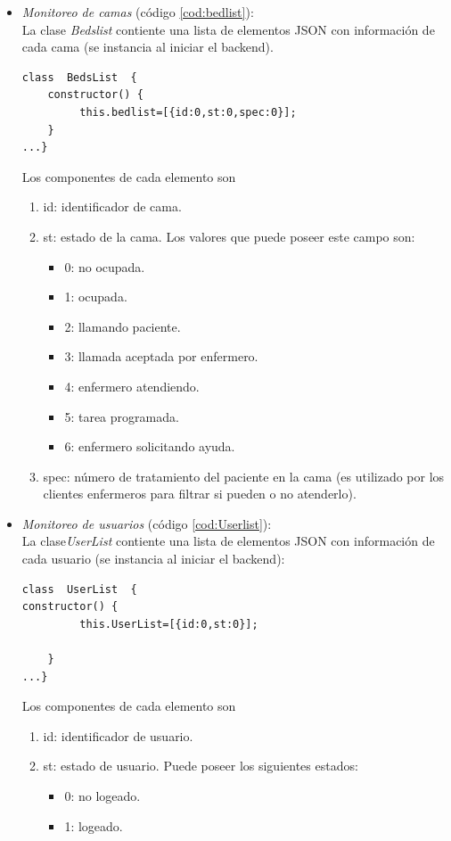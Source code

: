 \begin{itemize}

\item \textit{ Monitoreo de camas} (código \ref{cod:bedlist}):\\
La clase \textit{Bedslist} contiente una lista de elementos JSON con información de cada cama (se instancia al iniciar el backend).

\begin{lstlisting}[label=cod:bedlist,caption=  Clase Bedlist.]
class  BedsList  {    
    constructor() {
         this.bedlist=[{id:0,st:0,spec:0}];                        
    }
...}
\end{lstlisting}

Los componentes de cada elemento son 
\begin{enumerate}
\item id: identificador de cama.
\item st: estado de la cama. Los valores que puede poseer este campo son: 
\begin{itemize}
\item 0: no ocupada.
\item 1: ocupada.
\item 2: llamando paciente.
\item 3: llamada aceptada por enfermero.
\item 4: enfermero atendiendo.
\item 5: tarea programada.
\item 6: enfermero solicitando ayuda.
\end{itemize}
\item spec: número de tratamiento del paciente en la cama (es utilizado por los clientes enfermeros para filtrar si pueden o no atenderlo).
\end{enumerate}


\item \textit{ Monitoreo de usuarios} (código \ref{cod:Userlist}):\\
La clase\textit{UserList} contiente una lista de elementos JSON con información de cada usuario (se instancia al iniciar el backend):

\begin{lstlisting}[label=cod:Userlist,caption=  Clase Userlist.]
class  UserList  {   
constructor() {
         this.UserList=[{id:0,st:0}];                
        
    }
...}
\end{lstlisting}

Los componentes de cada elemento son 
	\begin{enumerate}
		\item id: identificador de usuario.
		\item st: estado de usuario. Puede poseer los siguientes estados: 
			\begin{itemize}
				\item 0: no logeado.
				\item 1: logeado.
			\end{itemize}
	\end{enumerate}





\end{itemize}
